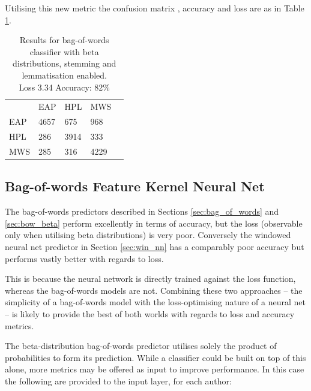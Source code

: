 Utilising this new metric the confusion matrix , accuracy and loss are as in Table \ref{tab:beta_res}.

\begin{table}[h]
\centering
\begin{tabular}{m{1cm}|m{1cm}|m{1cm}|m{1cm}|m{0cm}}
\multicolumn{1}{m{1cm}}{} & \multicolumn{1}{m{1cm}}{EAP} & \multicolumn{1}{m{1cm}}{HPL} & \multicolumn{1}{m{1cm}}{MWS} &\\[5pt]
\cline{2-4}
EAP & 4657 & 675 & 968 & \\[5pt]
\cline{2-4}
HPL & 286 & 3914 & 333 & \\[5pt]
\cline{2-4}
MWS & 285 & 316 & 4229 & \\[5pt]
\cline{2-4}
\end{tabular}
\caption{Results for bag-of-words classifier with beta distributions, stemming and lemmatisation enabled.\\Loss 3.34 Accuracy: 82\% }
\label{tab:beta_res}
\end{table}


   \subsection{Bag-of-words Feature Kernel Neural Net}
  \label{sec:bow_nn}
  The bag-of-words predictors described in Sections \ref{sec:bag_of_words} and \ref{sec:bow_beta} perform excellently in terms of accuracy, but the loss (observable only when utilising beta distributions) is very poor. Conversely the windowed neural net predictor in Section \ref{sec:win_nn} has a comparably poor accuracy but performs vastly better with regards to loss.
  
  This is because the neural network is directly trained against the loss function, whereas the bag-of-words models are not. Combining these two approaches -- the simplicity of a bag-of-words model with the loss-optimising nature of a neural net -- is likely to provide the best of both worlds with regards to loss and accuracy metrics.
  
  The beta-distribution bag-of-words predictor utilises solely the product of probabilities to form its prediction. While a classifier could be built on top of this alone, more metrics may be offered as input to improve performance. In this case the following are provided to the input layer, for each author:
  

